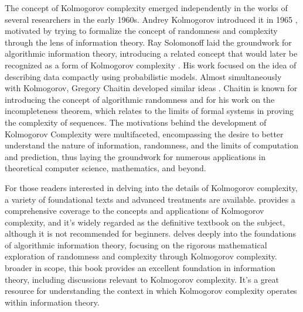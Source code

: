 The concept of Kolmogorov complexity emerged independently in the works of several researchers in the early 1960s. Andrey Kolmogorov introduced it in 1965 \cite{kolmogorov1965three}, motivated by trying to formalize the concept of randomness and complexity through the lens of information theory. Ray Solomonoff laid the groundwork for algorithmic information theory, introducing a related concept that would later be recognized as a form of Kolmogorov complexity \cite{solomonoff1964formal}. His work focused on the idea of describing data compactly using probabilistic models. Almost simultaneously with Kolmogorov, Gregory Chaitin developed similar ideas \cite{chaitin1969simplicity}. Chaitin is known for introducing the concept of algorithmic randomness and for his work on the incompleteness theorem, which relates to the limits of formal systems in proving the complexity of sequences. The motivations behind the development of Kolmogorov Complexity were multifaceted, encompassing the desire to better understand the nature of information, randomness, and the limits of computation and prediction, thus laying the groundwork for numerous applications in theoretical computer science, mathematics, and beyond.

For those readers interested in delving into the details of Kolmogorov complexity, a variety of foundational texts and advanced treatments are available. \cite{li2013introduction} provides a comprehensive coverage to the concepts and applications of Kolmogorov complexity, and it's widely regarded as the definitive textbook on the subject, although it is not recommended for beginners. \cite{calude2002information} delves deeply into the foundations of algorithmic information theory, focusing on the rigorous mathematical exploration of randomness and complexity through Kolmogorov complexity. \cite{cover2012elements} broader in scope, this book provides an excellent foundation in information theory, including discussions relevant to Kolmogorov complexity. It's a great resource for understanding the context in which Kolmogorov complexity operates within information theory.
